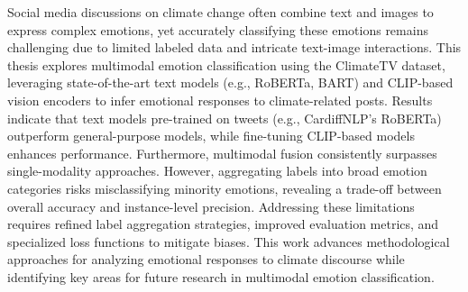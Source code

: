 Social media discussions on climate change often combine text and images to express complex emotions, yet accurately classifying these emotions remains challenging due to limited labeled data and intricate text-image interactions. This thesis explores multimodal emotion classification using the ClimateTV dataset, leveraging state-of-the-art text models (e.g., RoBERTa, BART) and CLIP-based vision encoders to infer emotional responses to climate-related posts. Results indicate that text models pre-trained on tweets (e.g., CardiffNLP’s RoBERTa) outperform general-purpose models, while fine-tuning CLIP-based models enhances performance. Furthermore, multimodal fusion consistently surpasses single-modality approaches. However, aggregating labels into broad emotion categories risks misclassifying minority emotions, revealing a trade-off between overall accuracy and instance-level precision. Addressing these limitations requires refined label aggregation strategies, improved evaluation metrics, and specialized loss functions to mitigate biases. This work advances methodological approaches for analyzing emotional responses to climate discourse while identifying key areas for future research in multimodal emotion classification.
